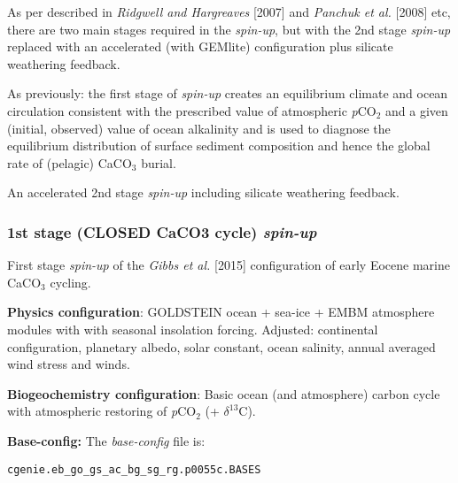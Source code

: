 \documentclass[10pt,twoside]{article}
\begin{document}
As per described in \textit{Ridgwell and Hargreaves} [2007] and \textit{Panchuk et al.} [2008] etc, there are two main stages required in the \textit{spin-up}, but with the 2nd stage \textit{spin-up} replaced with an accelerated (with GEMlite) configuration plus silicate weathering feedback.

        \begin{compactenum}
        
                \item As previously: the first stage of \textit{spin-up} creates an equilibrium climate and ocean circulation consistent with the prescribed value of atmospheric \textit{p}CO$_{2}$ and a given (initial, observed) value of ocean alkalinity and is used to diagnose the equilibrium distribution of surface sediment composition and hence the global rate of (pelagic) CaCO$_{3}$ burial.
                
                \item An accelerated 2nd stage \textit{spin-up} including silicate weathering feedback.
                
        \end{compactenum}


\subsubsection{1st stage (CLOSED CaCO3 cycle) \textit{spin-up}}\label{EXAMPLE.p0055c.Gibbsetal2015.SPIN1}

First stage \textsl{spin-up} of the \textit{Gibbs et al.} [2015] configuration of early Eocene marine CaCO$_{3}$ cycling.

\noindent \textbf{Physics configuration}: GOLDSTEIN ocean + sea-ice + EMBM atmosphere modules with with seasonal insolation forcing. Adjusted: continental configuration, planetary albedo, solar constant, ocean salinity, annual averaged wind stress and winds.

\noindent \textbf{Biogeochemistry configuration}: Basic ocean (and atmosphere) carbon cycle with atmospheric restoring of \textit{p}CO$_{2}$ (+ $\delta^{13}$C).

\noindent \textbf{Base-config:} The \textit{base-config} file is:
\vspace{-10pt}\begin{verbatim}cgenie.eb_go_gs_ac_bg_sg_rg.p0055c.BASES\end{verbatim}\vspace{-10pt}
\end{document}

